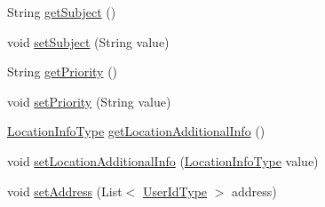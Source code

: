 \begin{DoxyCompactItemize}
\item 
String \hyperlink{classcom_1_1telefonica_1_1schemas_1_1unica_1_1rest_1_1mms_1_1v1_1_1MessageType_a8631c7467e1adf351234d16cb8be1699}{getSubject} ()
\item 
void \hyperlink{classcom_1_1telefonica_1_1schemas_1_1unica_1_1rest_1_1mms_1_1v1_1_1MessageType_aacf16830249f624f6d36aadc029fbed1}{setSubject} (String value)
\item 
String \hyperlink{classcom_1_1telefonica_1_1schemas_1_1unica_1_1rest_1_1mms_1_1v1_1_1MessageType_a9a093562f099185b8926ff5cd9d71fd5}{getPriority} ()
\item 
void \hyperlink{classcom_1_1telefonica_1_1schemas_1_1unica_1_1rest_1_1mms_1_1v1_1_1MessageType_a2249486603cd0de2e89aad0467ccd20f}{setPriority} (String value)
\item 
\hyperlink{classcom_1_1telefonica_1_1schemas_1_1unica_1_1rest_1_1mms_1_1v1_1_1LocationInfoType}{LocationInfoType} \hyperlink{classcom_1_1telefonica_1_1schemas_1_1unica_1_1rest_1_1mms_1_1v1_1_1MessageType_a975ac312bfbd35d1577bf02ca3899da6}{getLocationAdditionalInfo} ()
\item 
void \hyperlink{classcom_1_1telefonica_1_1schemas_1_1unica_1_1rest_1_1mms_1_1v1_1_1MessageType_acc66d467f0c9a32ed028da4f9e670e44}{setLocationAdditionalInfo} (\hyperlink{classcom_1_1telefonica_1_1schemas_1_1unica_1_1rest_1_1mms_1_1v1_1_1LocationInfoType}{LocationInfoType} value)
\item 
void \hyperlink{classcom_1_1telefonica_1_1schemas_1_1unica_1_1rest_1_1mms_1_1v1_1_1MessageType_adabc1bb09754250ffe4dc1dbbaf7b80e}{setAddress} (List$<$ \hyperlink{classcom_1_1telefonica_1_1schemas_1_1unica_1_1rest_1_1common_1_1v1_1_1UserIdType}{UserIdType} $>$ address)
\end{DoxyCompactItemize}
